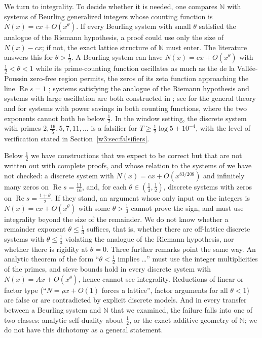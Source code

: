 \documentclass[11pt]{amsart}
\theoremstyle{definition}
\theoremstyle{remark}
\numberwithin{equation}{section}
\newcommand{\N}{\mathbb{N}}
\DeclareMathOperator{\Rel}{Re}
\begin{document}
\label{w7:fam:R20}
We turn to integrality. To decide whether it is needed, one compares $\N$ with systems of Beurling generalized
integers whose counting function is $N(x)=cx+O(x^\theta)$. If every Beurling system with small $\theta$
satisfied the analogue of the Riemann hypothesis, a proof could use only the size of $N(x)-cx$; if not, the
exact lattice structure of $\N$ must enter. The literature answers this for $\theta>\frac12$. A Beurling
system can have $N(x)=cx+O(x^\theta)$ with $\frac12<\theta<1$ while its prime-counting function oscillates as
much as the de la Vall\'ee-Poussin zero-free region permits, the zeros of its zeta function approaching the
line $\Rel s=1$ \cite{DMV2006}; systems satisfying the analogue of the Riemann hypothesis and systems with
large oscillation are both constructed in \cite{Zhang2007}; see \cite{DiamondZhang2016} for the general theory
and \cite{BDR2023} for systems with power savings in both counting functions, where the two exponents cannot
both be below $\frac12$. In the window setting, the discrete system with primes $2,\frac{16}5,5,7,11,\dots$ is
a falsifier for $T\ge\frac12\log5+10^{-4}$, with the level of verification stated in
Section~\ref{w3:sec:falsifiers}.

Below $\frac12$ we have constructions that we expect to be correct but that are not written out with complete
proofs, and whose relation to the systems of \cite{DiamondZhang2016} we have not checked: a discrete system
with $N(x)=cx+O(x^{83/208})$ and infinitely many zeros on $\Rel s=\frac{11}{16}$, and, for each
$\theta\in(\frac13,\frac12)$, discrete systems with zeros on $\Rel s=\frac{1+\theta}2$. If they stand, an
argument whose only input on the integers is $N(x)=cx+O(x^\theta)$ with some $\theta>\frac13$ cannot prove the
sign, and must use integrality beyond the size of the remainder. We do not know whether a remainder exponent
$\theta\le\frac13$ suffices, that is, whether there are off-lattice discrete systems with $\theta\le\frac13$
violating the analogue of the Riemann hypothesis, nor whether there is rigidity at $\theta=0$. Three further
remarks point the same way. An analytic theorem of the form ``$\theta<\frac12$ implies \dots'' must use the
integer multiplicities of the primes, and sieve bounds hold in every discrete system with
$N(x)=Ax+O(x^\theta)$, hence cannot see integrality. Reductions of linear or factor type (``$N=\rho x+O(1)$
forces a lattice'', factor arguments for all $\theta<1$) are false or are contradicted by explicit discrete
models. And in every transfer between a Beurling system and $\N$ that we examined, the failure falls into one
of two classes: analytic self-duality about $\frac12$, or the exact additive geometry of $\N$; we do not have
this dichotomy as a general statement.
\end{document}
